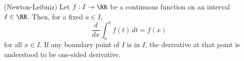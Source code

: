 

\begin{theorem}
(Newton-Leibniz) Let $f:I\to \RR$ be a continuous function on an 
interval $I\in \RR$. Then, for a fixed $a\in I$,
$$
\frac{d}{dx}\int_a^x f(t)\,dt = f(x)
$$
for all $x\in I$. If any boundary point of $I$ is in $I$, the 
derivative at that point is understood to be one-sided 
derivative.
\end{theorem}

